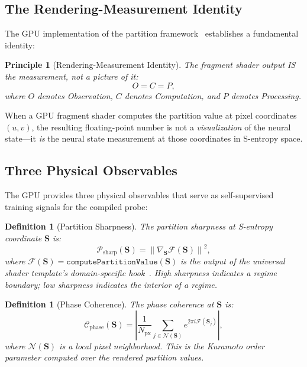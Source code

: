 \documentclass[aps,prd,twocolumn,superscriptaddress,floatfix,nofootinbib]{revtex4-2}
\newtheorem{definition}[theorem]{Definition}
\newtheorem{principle}[theorem]{Principle}
\theoremstyle{remark}
\newcommand{\Svec}{\mathbf{S}}
\begin{document}
\subsection{The Rendering-Measurement Identity}

The GPU implementation of the partition framework~\cite{sachikonye2026gpu} establishes a fundamental identity:

\begin{principle}[Rendering-Measurement Identity]
\label{princ:rmi}
The fragment shader output IS the measurement, not a picture of it:
\begin{equation}
\boxed{O = C = P,}
\label{eq:ocp}
\end{equation}
where $O$ denotes Observation, $C$ denotes Computation, and $P$ denotes Processing.
\end{principle}

When a GPU fragment shader computes the partition value at pixel coordinates $(u, v)$, the resulting floating-point number is not a \emph{visualization} of the neural state---it \emph{is} the neural state measurement at those coordinates in S-entropy space.

\subsection{Three Physical Observables}

The GPU provides three physical observables that serve as self-supervised training signals for the compiled probe:

\begin{definition}[Partition Sharpness]
\label{def:sharpness}
The partition sharpness at S-entropy coordinate $\Svec$ is:
\begin{equation}
\mathcal{P}_{\mathrm{sharp}}(\Svec) = \left\|\nabla_\Svec \mathcal{F}(\Svec)\right\|^2,
\label{eq:sharpness}
\end{equation}
where $\mathcal{F}(\Svec) = \texttt{computePartitionValue}(\Svec)$ is the output of the universal shader template's domain-specific hook~\cite{sachikonye2026gpu}.
High sharpness indicates a regime boundary; low sharpness indicates the interior of a regime.
\end{definition}

\begin{definition}[Phase Coherence]
\label{def:coherence}
The phase coherence at $\Svec$ is:
\begin{equation}
\mathcal{C}_{\mathrm{phase}}(\Svec) = \left|\frac{1}{N_{\mathrm{px}}}\sum_{j \in \mathcal{N}(\Svec)} e^{2\pi i \mathcal{F}(\Svec_j)}\right|,
\label{eq:coherence}
\end{equation}
where $\mathcal{N}(\Svec)$ is a local pixel neighborhood.
This is the Kuramoto order parameter computed over the rendered partition values.
\end{definition}
\end{document}

